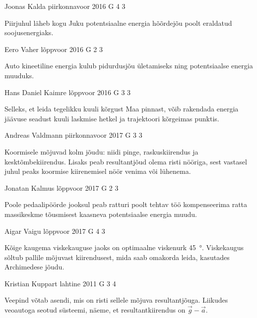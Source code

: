 \documentclass[11pt, twoside]{article}
\begin{document}
{%
{Joonas Kalda} %
{piirkonnavoor} %
{2016} %
{G 4} %
{3} %
{

\ifHint
Piirjuhul läheb kogu Juku potentsiaalne energia hõõrdejõu poolt eraldatud soojusenergiaks.
\fi
}

{Eero Vaher} %
{lõppvoor} %
{2016} %
{G 2} %
{3} %
{

\ifHint
Auto kineetiline energia kulub pidurdusjõu ületamiseks ning potentsiaalse energia muuduks.
\fi
}

{Hans Daniel Kaimre} %
{lõppvoor} %
{2016} %
{G 3} %
{3} %
{

\ifHint
Selleks, et leida tegelikku kuuli kõrgust Maa pinnast, võib rakendada energia jäävuse seadust kuuli laskmise hetkel ja trajektoori kõrgeimas punktis.
\fi
}

{Andreas Valdmann} %
{piirkonnavoor} %
{2017} %
{G 3} %
{3} %
{

\ifHint
Koormisele mõjuvad kolm jõudu: niidi pinge, raskuskiirendus ja kesktõmbekiirendus. Lisaks peab resultantjõud olema risti nööriga, sest vastasel juhul peaks koormise kiirenemisel nöör venima või lühenema.
\fi
}

{Jonatan Kalmus} %
{lõppvoor} %
{2017} %
{G 2} %
{3} %
{

\ifHint
Poole pedaalipöörde jooksul peab ratturi poolt tehtav töö kompenseerima ratta massikeskme tõusmisest kaasneva potentsiaalse energia muudu.
\fi
}

{Aigar Vaigu} %
{lõppvoor} %
{2017} %
{G 4} %
{3} %
{

\ifHint
Kõige kaugema viskekauguse jaoks on optimaalne viskenurk \SI{45}{\degree}. Viskekaugus sõltub pallile mõjuvast kiirendusest, mida saab omakorda leida, kasutades Archimedese jõudu.
\fi
}

{Kristian Kuppart} %
{lahtine} %
{2011} %
{G 3} %
{4} %
{

\ifHint
Veepind võtab asendi, mis on risti sellele mõjuva resultantjõuga. Liikudes veoautoga seotud süsteemi, näeme, et resultantkiirendus on $\vec g - \vec a$.
\fi
}

}
\end{document}
